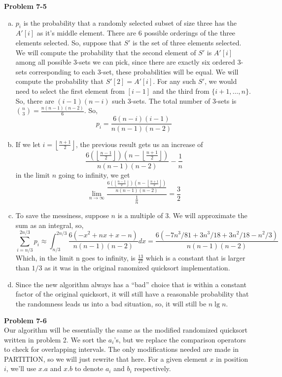 \documentclass{article}
\begin{document}
\noindent\textbf{Problem 7-5}\\
\begin{enumerate}[a.]
\item
$p_i$ is the probability that a randomly selected subset of size three has the $A'[i]$ as it's middle element. There are $6$ possible orderings of the three elements selected. So, suppose that $S'$ is the set of three elements selected. We will compute the probability that the second element of $S'$ is $A'[i]$ among all possible 3-sets we can pick, since there are exactly six ordered 3-sets corresponding to each 3-set, these probabilities will be equal. We will compute the probability that $S'[2] = A'[i]$. For any such $S'$, we would need to select the first element from $[i-1]$ and the third from $\{i+1,\ldots,n\}$. So, there are $(i-1)(n-i)$ such 3-sets. The total number of 3-sets is $\binom{n}{3} = \frac{n(n-1)(n-2)}{6}$. So, 
\[
p_i = \frac{6(n-i)(i-1)}{n(n-1)(n-2)}
\]

\item
If we let $i = \left\lfloor \frac{n+1}{2}\right\rfloor$, the previous result gets us an increase of 
\[
\frac{6(\left\lfloor\frac{n-1}{2}\right\rfloor)(n -\left\lfloor \frac{n+1}{2}\right\rfloor)}{n(n-1)(n-2)} - \frac{1}{n}
\]
in the limit $n$ going to infinity, we get
\[
\lim_{n\rightarrow \infty} \frac{\frac{6(\left\lfloor\frac{n-1}{2}\right\rfloor)(n -\left\lfloor \frac{n+1}{2}\right\rfloor)}{n(n-1)(n-2)}}{\frac{1}{n}} = \frac{3}{2}
\]

\item

To save the messiness, suppose $n$ is a multiple of 3. We will approximate the sum as an integral, so, 
\[
\sum_{i=n/3}^{2n/3} p_i \approx \int_{n/3}^{2n/3} \frac{6(-x^2+nx+x-n)}{n(n-1)(n-2)}dx = \frac{6(-7n^3/81 + 3n^3/18 + 3n^2/18- n^2/3)}{n(n-1)(n-2)}
\]
Which, in the limit n goes to infinity, is $\frac{13}{27}$ which is a constant that is larger than $1/3$ as it was in the original ranomized quicksort implementation.

\item
Since the new algorithm always has a ``bad'' choice that is within a constant factor of the original quicksort, it will still have a reasonable probability that the randomness leads us into a bad situation, so, it will still be $n\lg n$.
\end{enumerate}

\noindent\textbf{Problem 7-6}\\

Our algorithm will be essentially the same as the modified randomized quicksort written in problem 2.  We sort the $a_i$'s, but we replace the comparison operators to check for overlapping intervals.  The only modifications needed are made in PARTITION, so we will just rewrite that here.  For a given element $x$ in position $i$, we'll use $x.a$ and $x.b$ to denote $a_i$ and $b_i$ respectively.
\end{document}
